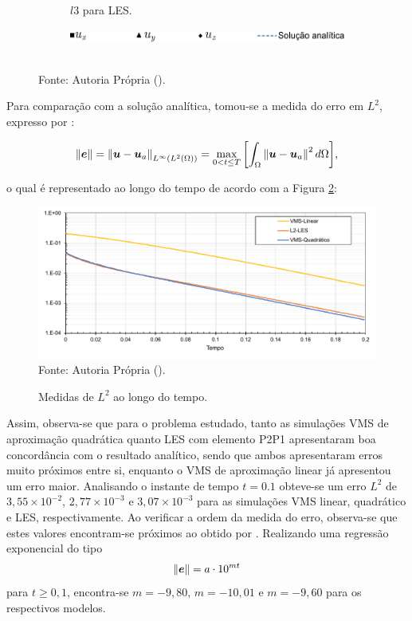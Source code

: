 \begin{figure}[h!]
\begin{subfigure}{0.42\textwidth}
        \caption{$l3$ para LES.}
    \end{subfigure}
    \begin{subfigure}{0.42\textwidth}
        \includegraphics[width=\linewidth]{Figuras/taylor-green/legenda.pdf}
    \end{subfigure}
    \\Fonte: Autoria Própria (\the\year).
    \label{fig:TGV-results}
\end{figure}

Para comparação com a solução analítica, tomou-se a medida do erro em $L^2$, expresso por \cite{dumon2011proper}:

\begin{equation}
    \left\lVert{\boldsymbol{e}}\right\lVert=\left\lVert{\boldsymbol{u}-\boldsymbol{u}_a}\right\lVert_{L^\infty(L^2(\Omega))}=\max_{0<t\leq T}{\left[\int_\Omega{\left\lVert{\boldsymbol{u}-\boldsymbol{u}_a}\right\lVert^2d\Omega}\right]}\text{,}
\end{equation}

\noindent o qual é representado ao longo do tempo de acordo com a Figura \ref{fig:TGV-L2}:

\begin{figure}[h!]
    \centering
    \caption{Medidas de $L^2$ ao longo do tempo.}
    \includegraphics[width=\linewidth]{Figuras/taylor-green/L2.pdf}
    \\Fonte: Autoria Própria (\the\year).
    \label{fig:TGV-L2}
\end{figure}

Assim, observa-se que para o problema estudado, tanto as simulações VMS de aproximação quadrática quanto LES com elemento P2P1 apresentaram boa concordância com o resultado analítico, sendo que ambos apresentaram erros muito próximos entre si, enquanto o VMS de aproximação linear já apresentou um erro maior. Analisando o instante de tempo $t=0.1$ obteve-se um erro $L^2$ de $3,55\times 10^{-2}$, $2,77\times 10^{-3}$ e $3,07\times 10^{-3}$ para as simulações VMS linear, quadrático e LES, respectivamente. Ao verificar a ordem da medida do erro, observa-se que estes valores encontram-se próximos ao obtido por . Realizando uma regressão exponencial do tipo \[\left\lVert{\boldsymbol{e}}\right\lVert=a\cdot10^{mt}\] para $t\geq 0,1$, encontra-se $m=-9,80$, $m=-10,01$ e $m=-9,60$ para os respectivos modelos.

